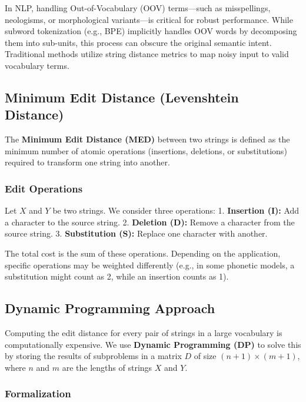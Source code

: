 \documentclass[
  italian,
  11pt,
]{article}
\begin{document}
In NLP, handling Out-of-Vocabulary (OOV) terms---such as misspellings,
neologisms, or morphological variants---is critical for robust
performance. While subword tokenization (e.g., BPE) implicitly handles
OOV words by decomposing them into sub-units, this process can obscure
the original semantic intent. Traditional methods utilize string
distance metrics to map noisy input to valid vocabulary terms.

\subsection{Minimum Edit Distance (Levenshtein
Distance)}\label{minimum-edit-distance-levenshtein-distance}

The \textbf{Minimum Edit Distance (MED)} between two strings is defined
as the minimum number of atomic operations (insertions, deletions, or
substitutions) required to transform one string into another.

\subsubsection{Edit Operations}\label{edit-operations}

Let \(X\) and \(Y\) be two strings. We consider three operations: 1.
\textbf{Insertion (I):} Add a character to the source string. 2.
\textbf{Deletion (D):} Remove a character from the source string. 3.
\textbf{Substitution (S):} Replace one character with another.

The total cost is the sum of these operations. Depending on the
application, specific operations may be weighted differently (e.g., in
some phonetic models, a substitution might count as 2, while an
insertion counts as 1).

\subsection{Dynamic Programming
Approach}\label{dynamic-programming-approach}

Computing the edit distance for every pair of strings in a large
vocabulary is computationally expensive. We use \textbf{Dynamic
Programming (DP)} to solve this by storing the results of subproblems in
a matrix \(D\) of size \((n+1) \times (m+1)\), where \(n\) and \(m\) are
the lengths of strings \(X\) and \(Y\).

\subsubsection{Formalization}\label{formalization}
\end{document}
